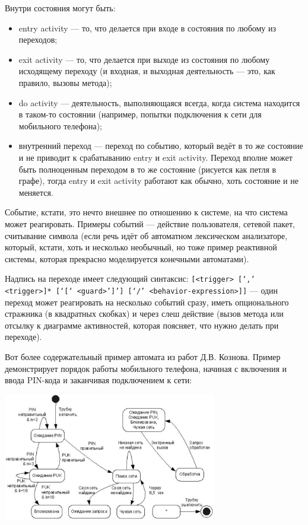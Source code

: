 \documentclass[a5paper]{article}
\begin{document}
Внутри состояния могут быть:

\begin{itemize}
	\item entry activity --- то, что делается при входе в состояния по любому из переходов;
	\item exit activity --- то, что делается при выходе из состояния по любому исходящему переходу (и входная, и выходная деятельность --- это, как правило, вызовы метода);
	\item do activity --- деятельность, выполняющаяся всегда, когда система находится в таком-то состоянии (например, попытки подключения к сети для мобильного телефона);
	\item внутренний переход --- переход по событию, который ведёт в то же состояние и не приводит к срабатыванию entry и exit activity. Переход вполне может быть полноценным переходом в то же состояние (рисуется как петля в графе), тогда entry и exit activity работают как обычно, хоть состояние и не меняется.
\end{itemize}

Событие, кстати, это нечто внешнее по отношению к системе, на что система может реагировать. Примеры событий --- действие пользователя, сетевой пакет, считывание символа (если речь идёт об автоматном лексическом анализаторе, который, кстати, хоть и несколько необычный, но тоже пример реактивной системы, которая прекрасно моделируется конечными автоматами).

Надпись на переходе имеет следующий синтаксис: \verb|[<trigger> [‘,’ <trigger>]* [‘[‘ <guard>’]’] [‘/’ <behavior-expression>]]| --- один переход может реагировать на несколько событий сразу, иметь опционального стражника (в квадратных скобках) и через слеш действие (вызов метода или отсылку к диаграмме активностей, которая поясняет, что нужно делать при переходе).

Вот более содержательный пример автомата из работ Д.В. Кознова. Пример демонстрирует порядок работы мобильного телефона, начиная с включения и ввода PIN-кода и заканчивая подключением к сети:

\begin{center}
	\includegraphics[width=0.7\textwidth]{stateTransitionExample2.png}
\end{center}
\end{document}
